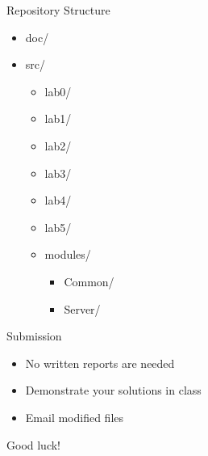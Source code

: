 \documentclass[compress,xcolor=table]{beamer}
\begin{document}
\begin{frame}{Repository Structure}
  \centering
  \begin{itemize}
    \item doc/
    \item src/
      \begin{itemize}
        \item lab0/
        \item lab1/
        \item lab2/
        \item lab3/
        \item lab4/
        \item lab5/
        \item modules/
          \begin{itemize}
            \item Common/
            \item Server/
          \end{itemize}
      \end{itemize}
  \end{itemize}
\end{frame}

\begin{frame}{Submission}
  \centering
  \begin{itemize}
    \item No written reports are needed
    \item Demonstrate your solutions in class
    \item Email modified files
  \end{itemize}
\end{frame}

\begin{frame}
  \vspace{3em}
  \begin{center}
    {\huge Good luck!}
  \end{center}
\end{frame}
\end{document}
